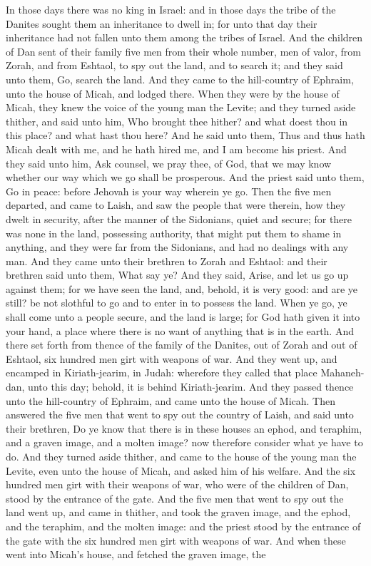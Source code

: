 In those days there was no king in Israel: and in those days the tribe of the Danites sought them an inheritance to dwell in; for unto that day their inheritance had not fallen unto them among the tribes of Israel. And the children of Dan sent of their family five men from their whole number, men of valor, from Zorah, and from Eshtaol, to spy out the land, and to search it; and they said unto them, Go, search the land. And they came to the hill-country of Ephraim, unto the house of Micah, and lodged there. When they were by the house of Micah, they knew the voice of the young man the Levite; and they turned aside thither, and said unto him, Who brought thee hither? and what doest thou in this place? and what hast thou here? And he said unto them, Thus and thus hath Micah dealt with me, and he hath hired me, and I am become his priest. And they said unto him, Ask counsel, we pray thee, of God, that we may know whether our way which we go shall be prosperous. And the priest said unto them, Go in peace: before Jehovah is your way wherein ye go.  Then the five men departed, and came to Laish, and saw the people that were therein, how they dwelt in security, after the manner of the Sidonians, quiet and secure; for there was none in the land, possessing authority, that might put them to shame in anything, and they were far from the Sidonians, and had no dealings with any man. And they came unto their brethren to Zorah and Eshtaol: and their brethren said unto them, What say ye? And they said, Arise, and let us go up against them; for we have seen the land, and, behold, it is very good: and are ye still? be not slothful to go and to enter in to possess the land. When ye go, ye shall come unto a people secure, and the land is large; for God hath given it into your hand, a place where there is no want of anything that is in the earth.  And there set forth from thence of the family of the Danites, out of Zorah and out of Eshtaol, six hundred men girt with weapons of war. And they went up, and encamped in Kiriath-jearim, in Judah: wherefore they called that place Mahaneh-dan, unto this day; behold, it is behind Kiriath-jearim. And they passed thence unto the hill-country of Ephraim, and came unto the house of Micah.  Then answered the five men that went to spy out the country of Laish, and said unto their brethren, Do ye know that there is in these houses an ephod, and teraphim, and a graven image, and a molten image? now therefore consider what ye have to do. And they turned aside thither, and came to the house of the young man the Levite, even unto the house of Micah, and asked him of his welfare. And the six hundred men girt with their weapons of war, who were of the children of Dan, stood by the entrance of the gate. And the five men that went to spy out the land went up, and came in thither, and took the graven image, and the ephod, and the teraphim, and the molten image: and the priest stood by the entrance of the gate with the six hundred men girt with weapons of war. And when these went into Micah’s house, and fetched the graven image, the 